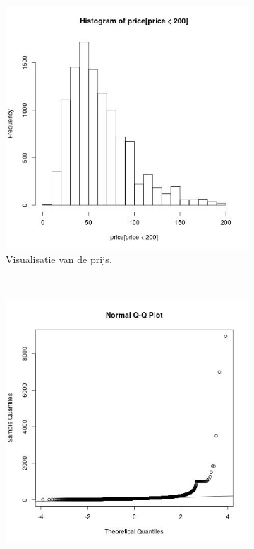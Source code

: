 \documentclass[a4paper,kulak]{kulakarticle} %
\begin{document}
\begin{figure}[H]
	\centering
	\begin{subfigure}[b]{0.23\textwidth}
		\includegraphics[width=\textwidth]{prijsVis.jpg}
		\caption{Visualisatie van de prijs.}
		\label{fig:pv}
	\end{subfigure}
	~ %
	\begin{subfigure}[b]{0.23\textwidth}
		\includegraphics[width=\textwidth]{qqp.jpg}

\end{subfigure}
\end{figure}
\end{document}

